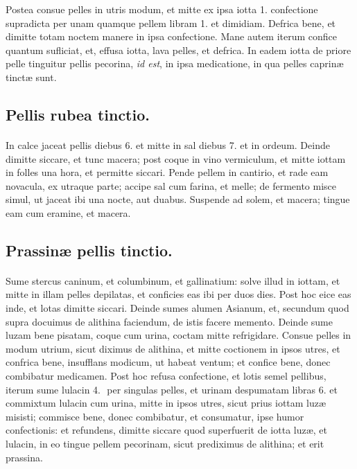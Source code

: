 \documentclass[a4paper, 11pt, oneside, polutonikogreek, italian]{article}
\newcommand*\svgaaa{}
\begin{document}
Postea consue pelles in utris modum, et mitte ex ipsa iotta 1. confectione supradicta per unam quamque pellem libram 1. et dimidiam. Defrica bene, et dimitte totam noctem manere in ipsa confectione. Mane autem iterum confice quantum sufliciat, et, effusa iotta, lava pelles, et defrica. In eadem iotta de priore pelle tinguitur pellis pecorina, \emph{id est}, in ipsa medicatione, in qua pelles caprinæ tinctæ sunt.

\subsection{Pellis rubea tinctio.}
\paragraph{}
In calce jaceat pellis diebus 6. et mitte in sal diebus 7. et in ordeum. Deinde dimitte siccare, et tunc macera; post coque in vino vermiculum, et mitte iottam in folles una hora, et permitte siccari. Pende pellem in cantirio, et rade eam novacula, ex utraque parte; accipe sal cum farina, et melle; de fermento misce simul, ut jaceat ibi una nocte, aut duabus. Suspende ad solem, et macera; tingue eam cum eramine, et macera.

\subsection{Prassinæ pellis tinctio.}
\paragraph{}
Sume stercus caninum, et columbinum, et gallinatium: solve illud in iottam, et mitte in illam pelles depilatas, et conficies eas ibi per duos dies. Post hoc eice eas inde, et lotas dimitte siccari. Deinde sumes alumen Asianum, et, secundum quod supra docuimus de alithina faciendum, de istis facere memento. Deinde sume luzam bene pisatam, coque cum urina, coctam mitte refrigidare. Consue pelles in modum utrium, sicut diximus de alithina, et mitte coctionem in ipsos utres, et confrica bene, insufflans modicum, ut habeat ventum; et confice bene, donec combibatur medicamen. Post hoc refusa confectione, et lotis semel pellibus, iterum sume lulacin 4. $\svgaaa$ per singulas pelles, et urinam despumatam libras 6. et commixtum lulacin cum urina, mitte in ipsos utres, sicut prius iottam luzæ misisti; commisce bene, donec combibatur, et consumatur, ipse humor confectionis: et refundens, dimitte siccare quod superfuerit de iotta luzæ, et lulacin, in eo tingue pellem pecorinam, sicut prediximus de alithina; et erit prassina.
\end{document}
